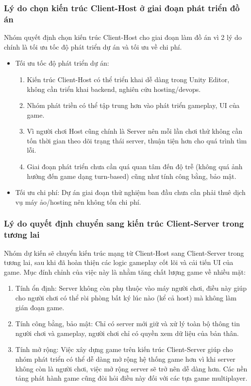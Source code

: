\subsubsection{Lý do chọn kiến trúc Client-Host ở giai đoạn phát triển đồ án}
Nhóm quyết định chọn kiến trúc Client-Host cho giai đoạn làm đồ án vì 2 lý do chính là tối ưu tốc độ phát triển dự án và tối ưu về chi phí.
\begin{itemize}
    \item Tối ưu tốc độ phát triển dự án:
    \begin{enumerate}[+]
        \item Kiến trúc Client-Host có thể triển khai dễ dàng trong Unity Editor, không cần triển khai backend, nghiên cứu hosting/devops.
        \item Nhóm phát triền có thể tập trung hơn vào phát triển gameplay, UI của game.
        \item Vì người chơi Host cũng chính là Server nên mỗi lần chơi thử không cần tốn thời gian theo dõi trạng thái server, thuận tiện hơn cho quá trình tìm lỗi.
        \item Giai đoạn phát triển chưa cần quá quan tâm đến độ trễ (không quá ảnh hưởng đến game dạng turn-based) cũng như tính công bằng, bảo mật.
    \end{enumerate}
    \item Tối ưu chi phí: Dự án giai đoạn thử nghiệm ban đầu chưa cần phải thuê dịch vụ máy ảo/hosting nên không tốn chi phí.
\end{itemize}    
\subsubsection{Lý do quyết định chuyển sang kiến trúc Client-Server trong tương lai}
Nhóm dự kiến sẽ chuyển kiến trúc mạng từ Client-Host sang Client-Server trong tương lai, sau khi đã hoàn thiện các logic gameplay cốt lõi và cải tiến UI của game. Mục đính chỉnh của việc này là nhằm tăng chất lượng game về nhiều mặt:
\begin{enumerate}[$\bullet$]
    \item Tính ổn định: Server không còn phụ thuộc vào máy người chơi, điều này giúp cho người chơi có thể ròi phòng bất ký lúc nào (kể cả host) mà không làm gián đoạn game.
    \item Tính công bằng, bảo mật: Chỉ có server mới giữ và xử lý toàn bộ thông tin người chơi và gameplay, người chơi chỉ có quyền xem dữ liệu của bản thân.
    \item Tính mở rộng: Việc xây dựng game trên kiến trúc Client-Server giúp cho nhóm phát triển có thể dễ dàng mở rộng hệ thống game hơn vì khi server không còn là người chơi, việc mở rộng server sẽ trở nên dễ dàng hơn. Các nền tảng phát hành game cũng đòi hỏi điều này đối với các tựa game multiplayer.
\end{enumerate}